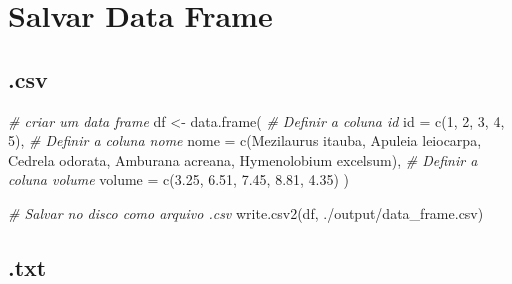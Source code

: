 \documentclass[
]{article}
\newenvironment{Shaded}{\begin{snugshade}}{\end{snugshade}}
\newcommand{\AttributeTok}[1]{\textcolor[rgb]{0.77,0.63,0.00}{#1}}
\newcommand{\CommentTok}[1]{\textcolor[rgb]{0.56,0.35,0.01}{\textit{#1}}}
\newcommand{\DecValTok}[1]{\textcolor[rgb]{0.00,0.00,0.81}{#1}}
\newcommand{\FloatTok}[1]{\textcolor[rgb]{0.00,0.00,0.81}{#1}}
\newcommand{\FunctionTok}[1]{\textcolor[rgb]{0.00,0.00,0.00}{#1}}
\newcommand{\NormalTok}[1]{#1}
\newcommand{\OtherTok}[1]{\textcolor[rgb]{0.56,0.35,0.01}{#1}}
\newcommand{\StringTok}[1]{\textcolor[rgb]{0.31,0.60,0.02}{#1}}
\begin{document}
\hypertarget{salvar-data-frame}{%
\section{Salvar Data Frame}\label{salvar-data-frame}}

\hypertarget{csv}{%
\subsection{.csv}\label{csv}}

\begin{Shaded}
\begin{Highlighting}[]
\CommentTok{\# criar um data frame}
\NormalTok{df }\OtherTok{\textless{}{-}} \FunctionTok{data.frame}\NormalTok{(}
    \CommentTok{\# Definir a coluna id}
    \AttributeTok{id =} \FunctionTok{c}\NormalTok{(}\DecValTok{1}\NormalTok{, }\DecValTok{2}\NormalTok{, }\DecValTok{3}\NormalTok{, }\DecValTok{4}\NormalTok{, }\DecValTok{5}\NormalTok{),}
    \CommentTok{\# Definir a coluna nome}
    \AttributeTok{nome =} \FunctionTok{c}\NormalTok{(}\StringTok{\textquotesingle{}Mezilaurus itauba\textquotesingle{}}\NormalTok{, }\StringTok{\textquotesingle{}Apuleia leiocarpa\textquotesingle{}}\NormalTok{, }\StringTok{\textquotesingle{}Cedrela odorata\textquotesingle{}}\NormalTok{, }
             \StringTok{\textquotesingle{}Amburana acreana\textquotesingle{}}\NormalTok{, }\StringTok{\textquotesingle{}Hymenolobium excelsum\textquotesingle{}}\NormalTok{),}
    \CommentTok{\# Definir a coluna volume}
    \AttributeTok{volume =} \FunctionTok{c}\NormalTok{(}\FloatTok{3.25}\NormalTok{, }\FloatTok{6.51}\NormalTok{, }\FloatTok{7.45}\NormalTok{, }\FloatTok{8.81}\NormalTok{, }\FloatTok{4.35}\NormalTok{)}
\NormalTok{)}
\end{Highlighting}
\end{Shaded}

\begin{Shaded}
\begin{Highlighting}[]
\CommentTok{\# Salvar no disco como arquivo .csv}
\FunctionTok{write.csv2}\NormalTok{(df, }\StringTok{\textquotesingle{}./output/data\_frame.csv\textquotesingle{}}\NormalTok{)}
\end{Highlighting}
\end{Shaded}

\hypertarget{txt}{%
\subsection{.txt}\label{txt}}
\end{document}
